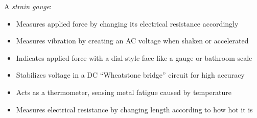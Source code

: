 A {\it strain gauge}:

\begin{itemize}
\item{} Measures applied force by changing its electrical resistance accordingly
\vskip 5pt 
\item{} Measures vibration by creating an AC voltage when shaken or accelerated
\vskip 5pt 
\item{} Indicates applied force with a dial-style face like a gauge or bathroom scale
\vskip 5pt 
\item{} Stabilizes voltage in a DC ``Wheatstone bridge'' circuit for high accuracy
\vskip 5pt 
\item{} Acts as a thermometer, sensing metal fatigue caused by temperature
\vskip 5pt 
\item{} Measures electrical resistance by changing length according to how hot it is
\end{itemize}




